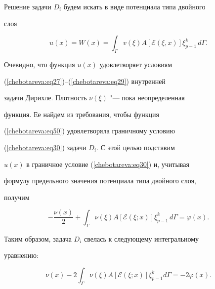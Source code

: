 

Решение задачи $D_i$ будем искать в виде потенциала типа двойного


слоя


\begin{equation}


\label{chebotareva:eq50} u(x) = W(x) = \int_\Gamma v(\xi


)A\left[ {\mathcal{E}(\xi , x)} \right]\xi _{p - 1}^k\, d\Gamma  .


\end{equation}





Очевидно,  что функция $u(x)$ удовлетворяет условиям


(\ref{chebotareva:eq27})--(\ref{chebotareva:eq29}) внутренней


задачи Дирихле. Плотность $\nu (\xi )$ "--- пока неопределенная


функция. Ее найдем из требования,  чтобы функция


(\ref{chebotareva:eq50}) удовлетворяла граничному условию


(\ref{chebotareva:eq30}) задачи $D_i $. С этой целью подставим


$u(x)$ в граничное условие (\ref{chebotareva:eq30}) и,  учитывая


формулу предельного значения потенциала типа двойного слоя, 


получим


\[


-\frac{\nu (x)}{2} + \int_{\Gamma}{\nu \left(\xi


\right)}A\left[\mathcal{E}\left(\xi; x\right)\right]\xi_{p-1}^{k}\,d\Gamma


= \varphi(x) .


\]





Таким образом,  задача $D_i $ свелась к следующему интегральному


уравнению:


\begin{equation}


\label{chebotareva:eq51} \nu(x) - 2\int_{\Gamma} \nu (\xi)


A\left[\mathcal{E}\left(\xi; x\right)\right]\xi_{p - 1}^{k}d\Gamma


= - 2\varphi (x).


\end{equation}


